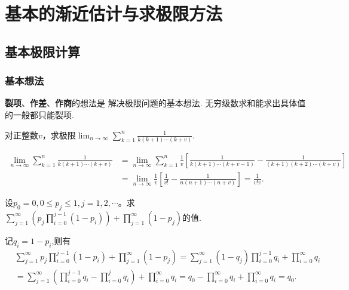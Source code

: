 \documentclass[../../main.tex]{subfiles}%
\begin{document}
\section{基本的渐近估计与求极限方法}

\subsection{基本极限计算}

\subsubsection{基本想法}

\textbf{裂项}、\textbf{作差}、\textbf{作商}的想法是
解决极限问题的基本想法.
无穷级数求和能求出具体值的一般都只能裂项.

\begin{example}
对正整数\(v\)，求极限\(\lim_{n\rightarrow\infty}\sum_{k = 1}^{n}\frac{1}{k(k + 1)\cdots(k + v)}\).
\end{example}
\begin{solution}
\begin{align*}
\lim_{n\rightarrow \infty} \sum_{k=1}^n{\frac{1}{k(k+1)\cdots (k+v)}}&=\lim_{n\rightarrow \infty} \sum_{k=1}^n{\frac{1}{v}\left[ \frac{1}{k\left( k+1 \right) \cdots \left( k+v-1 \right)}-\frac{1}{\left( k+1 \right) \left( k+2 \right) \cdots \left( k+v \right)} \right]}
\\
&=\lim_{n\rightarrow \infty} \frac{1}{v}\left[ \frac{1}{v!}-\frac{1}{n\left( n+1 \right) \cdots \left( n+v \right)} \right] =\frac{1}{v!v}.
\end{align*}

\end{solution}

\begin{example}
设\(p_0 = 0,0\leqslant  p_j\leqslant 1,j = 1,2,\cdots\)。求\(\sum_{j = 1}^{\infty}\left(p_j\prod_{i = 0}^{j - 1}(1 - p_i)\right)+\prod_{j = 1}^{\infty}(1 - p_j)\)的值.
\end{example}
\begin{solution}
记$q_i=1-p_i$,则有
\begin{align*}
&\sum_{j=1}^{\infty}{p_j\prod_{i=0}^{j-1}{\left( 1-p_i \right)}}+\prod_{j=1}^{\infty}{\left( 1-p_j \right)}=\sum_{j=1}^{\infty}{\left( 1-q_j \right) \prod_{i=0}^{j-1}{q_i}}+\prod_{i=0}^{\infty}{q_i}
\\
&=\sum_{j=1}^{\infty}{\left( \prod_{i=0}^{j-1}{q_i}-\prod_{i=0}^j{q_i} \right)}+\prod_{i=0}^{\infty}{q_i}=q_0-\prod_{i=0}^{\infty}{q_i}+\prod_{i=0}^{\infty}{q_i}=q_0.
\end{align*}
\end{solution}
\end{document}
